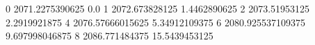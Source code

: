 0 2071.2275390625 0.0
1 2072.673828125 1.4462890625
2 2073.51953125 2.2919921875
4 2076.57666015625 5.34912109375
6 2080.925537109375 9.697998046875
8 2086.771484375 15.5439453125
